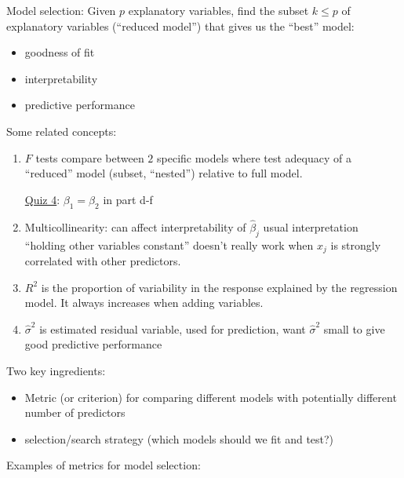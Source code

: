 Model selection:
Given $ p $ explanatory variables, find the subset
$ k\leqslant p $ of explanatory variables
(``reduced model'') that gives us
the ``best'' model:
\begin{itemize}
      \item goodness of fit
      \item interpretability
      \item predictive performance
\end{itemize}

Some related concepts:
\begin{enumerate}
      \item $ F $ tests compare between $ 2 $
            specific models where test adequacy of
            a ``reduced'' model (subset, ``nested'')
            relative to full model.

            \underline{Quiz 4}: $ \beta_1=\beta_2 $
            in part d-f
      \item Multicollinearity: can affect interpretability
            of $ \hat{\beta}_j $ usual interpretation
            ``holding other variables constant''
            doesn't really work when $ x_j $ is
            strongly correlated with other predictors.
      \item $ R^2 $ is the proportion
            of variability in the response explained by
            the regression model. It always increases
            when adding variables.
      \item $ \hat{\sigma}^2 $ is estimated residual variable,
            used for prediction, want $ \hat{\sigma}^2 $ small
            to give good predictive performance
\end{enumerate}
Two key ingredients:
\begin{itemize}
      \item Metric (or criterion) for comparing
            different models with potentially different number
            of predictors
      \item selection/search strategy (which models
            should we fit and test?)
\end{itemize}
Examples of metrics for model selection:

